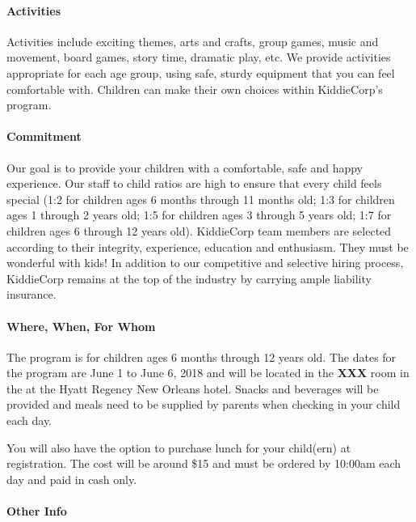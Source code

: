 \paragraph{Activities} Activities include exciting themes, arts  and  crafts, group games, music
and  movement, board games, story time, dramatic play, etc. We provide
activities appropriate for each age group, using safe, sturdy equipment that
you can feel comfortable with. Children can make their own choices within
KiddieCorp's program.


\paragraph{Commitment} Our goal is to provide your children with a comfortable, safe and happy
experience. Our staff to child ratios are high to ensure that every child
feels special (1:2 for children ages 6 months through 11 months old; 1:3 for
children ages 1 through 2 years old; 1:5 for children ages 3 through 5 years
old; 1:7 for children ages 6 through 12 years old). KiddieCorp team members
are selected according to their integrity, experience, education and
enthusiasm. They must be wonderful with kids! In addition to our competitive
and selective hiring process, KiddieCorp remains at the top of the industry
by carrying ample liability insurance.


\paragraph{Where, When, For Whom} The program is for children ages 6 months through 12 years old. The dates
for the program are June 1 to June 6, 2018  and will be located in the \textbf{XXX}
room in the at the Hyatt Regency New Orleans hotel.  Snacks and beverages
will be provided and meals need to be supplied by parents when checking in
your child each day.

You will also have the option to purchase lunch for your child(ern) at
registration. The cost will be around \$15 and must be ordered by 10:00am each day and
paid in cash only. 


\paragraph{Other Info}

